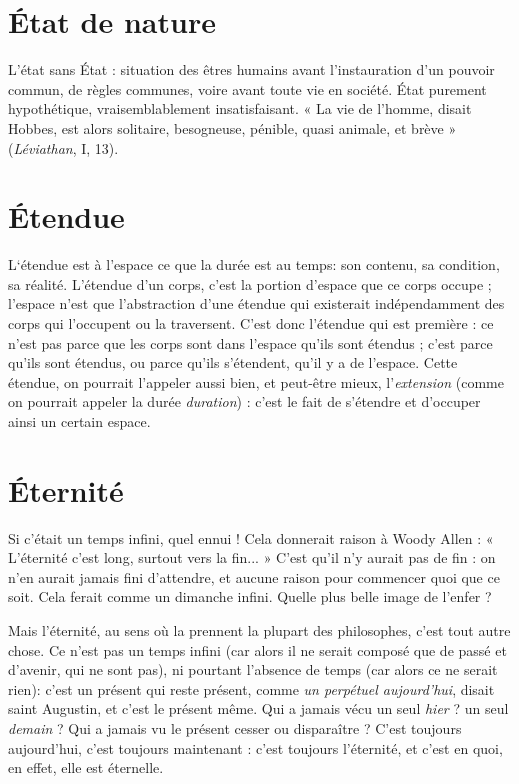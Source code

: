 \section{État de nature}
L'état sans État : situation des êtres humains avant
l'instauration d’un pouvoir commun, de règles communes,
voire avant toute vie en société. État purement hypothétique, vraisemblablement
insatisfaisant. « La vie de l’homme, disait Hobbes, est alors solitaire,
besogneuse, pénible, quasi animale, et brève » ({\it Léviathan}, I, 13).

\section{Étendue}
L‘étendue est à l’espace ce que la durée est au temps: son
contenu, sa condition, sa réalité. L’étendue d’un corps, c’est la
portion d’espace que ce corps occupe ; l’espace n’est que l’abstraction d’une
étendue qui existerait indépendamment des corps qui l’occupent ou la traversent.
C’est donc l’étendue qui est première : ce n’est pas parce que les corps
sont dans l’espace qu’ils sont étendus ; c’est parce qu’ils sont étendus, ou parce
qu’ils s'étendent, qu’il y a de l’espace. Cette étendue, on pourrait l’appeler aussi
bien, et peut-être mieux, l'{\it extension} (comme on pourrait appeler la durée
{\it duration}) : c’est le fait de s’étendre et d’occuper ainsi un certain espace.

\section{Éternité}
Si c'était un temps infini, quel ennui ! Cela donnerait raison à
Woody Allen : « L’éternité c’est long, surtout vers la fin... »
C’est qu’il n’y aurait pas de fin : on n’en aurait jamais fini d’attendre, et aucune
raison pour commencer quoi que ce soit. Cela ferait comme un dimanche
infini. Quelle plus belle image de l’enfer ?

Mais l'éternité, au sens où la prennent la plupart des philosophes, c’est tout
autre chose. Ce n’est pas un temps infini (car alors il ne serait composé que de
passé et d’avenir, qui ne sont pas), ni pourtant l’absence de temps (car alors ce
ne serait rien): c’est un présent qui reste présent, comme {\it un perpétuel
aujourd'hui}, disait saint Augustin, et c’est le présent même. Qui a jamais vécu
un seul {\it hier} ? un seul {\it demain} ? Qui a jamais vu le présent cesser ou disparaître ?
C’est toujours aujourd’hui, c’est toujours maintenant : c’est toujours l'éternité,
et c’est en quoi, en effet, elle est éternelle.

